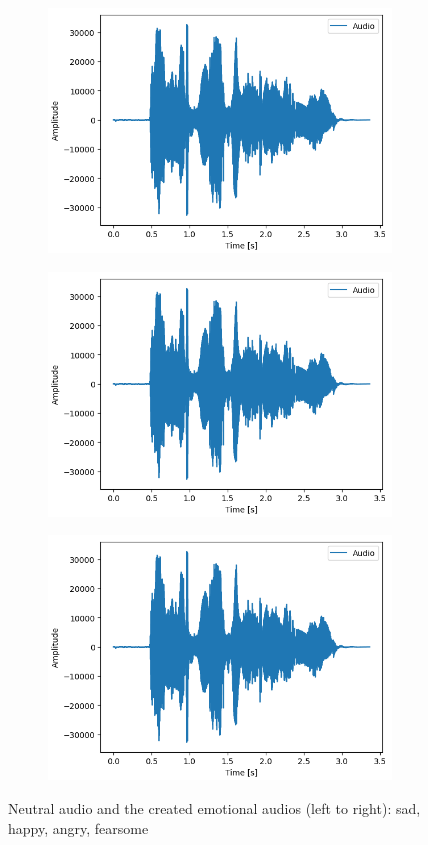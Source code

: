 \documentclass[11pt]{article}
\begin{document}
\begin{figure}
\begin{subfigure}{.15\textwidth}
  \includegraphics[width=.8\linewidth]{Bilder/art_sad.png}
  \label{fig:sfig2}
\end{subfigure}
\begin{subfigure}{.15\textwidth}
  \centering
  \includegraphics[width=.8\linewidth]{Bilder/art_sad.png}
  \label{fig:sfig2}
\end{subfigure}
\begin{subfigure}{.15\textwidth}
  \centering
  \includegraphics[width=.8\linewidth]{Bilder/art_sad.png}
  \label{fig:sfig2}
\end{subfigure}
\caption{Neutral audio and the created emotional audios (left to right): sad, happy, angry, fearsome}
\label{fig:fig}
\end{figure}
\end{document}
